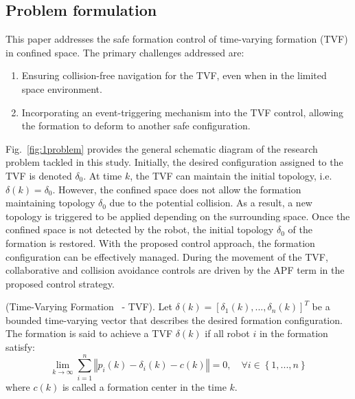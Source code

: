 \subsection{Problem formulation}

This paper addresses the safe formation control of time-varying formation (TVF) in confined space. The primary challenges addressed are:
\begin{enumerate}
    \item Ensuring collision-free navigation for the TVF, even when in the limited space environment.
        \item Incorporating an event-triggering mechanism into the TVF control, allowing the formation to deform to another safe configuration.
\end{enumerate}

Fig.~\ref{fig:1problem} provides the general schematic diagram of the research problem tackled in this study. Initially, the desired configuration assigned to the TVF is denoted $\delta_0$. At time $k$, the TVF can maintain the initial topology, i.e. $\delta(k)=\delta_0$. However, the confined space does not allow the formation maintaining topology $\delta_0$ due to the potential collision. As a result, a new topology is triggered to be applied depending on the surrounding space. Once the confined space is not detected by the robot, the initial topology $\delta_0$ of the formation is restored. With the proposed control approach, the formation configuration can be effectively managed. During the movement of the TVF, collaborative and collision avoidance controls are driven by the APF term in the proposed control strategy.

\begin{definition}\label{def_tvf}
(Time-Varying Formation~\cite{Dong2015,Dong2016} - TVF).  Let $\delta(k)=\left[\delta_1(k),...,\delta_n(k)\right]^T$ be a bounded time-varying vector that describes the desired formation configuration. The formation is said to achieve a TVF $\delta(k)$ if all robot $i$ in the formation satisfy:
\begin{equation}
    \lim_{k\to\infty}\sum_{i=1}^n\left\Vert p_i(k)-\delta_i(k)-c(k)\right\Vert=0,\quad\forall i\in\left\{1,...,n\right\}
\end{equation}
where $c(k)$ is called a formation center in the time $k$.
\end{definition}

